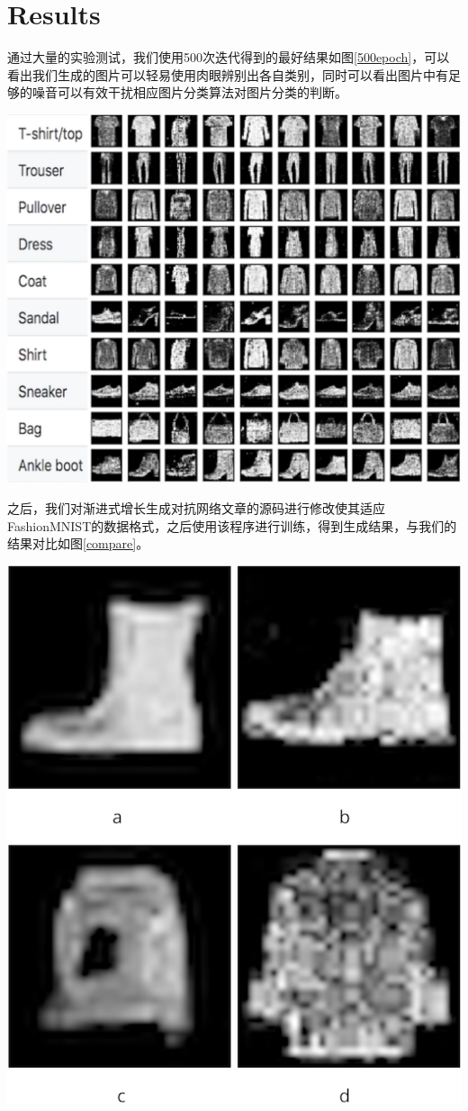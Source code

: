 \documentclass[12pt]{article}
\begin{document}
\section*{Results}
  通过大量的实验测试，我们使用500次迭代得到的最好结果如图\ref{500epoch}，可以看出我们生成的图片可以轻易使用肉眼辨别出各自类别，同时可以看出图片中有足够的噪音可以有效干扰相应图片分类算法对图片分类的判断。

\begin{center}\vspace{1cm}
\includegraphics[width=0.8\linewidth]{label_epoch500.png}
\label{500epoch}
\end{center}\vspace{1cm}

 之后，我们对渐进式增长生成对抗网络\supercite{DBLP:journals/corr/abs-1710-10196}文章的源码进行修改使其适应FashionMNIST的数据格式，之后使用该程序进行训练，得到生成结果，与我们的结果对比如图\ref{compare}。
\begin{center}\vspace{1cm}
\includegraphics[width=0.5\linewidth]{compare.png}
\label{compare}
\end{center}\vspace{1cm}
\end{document}
